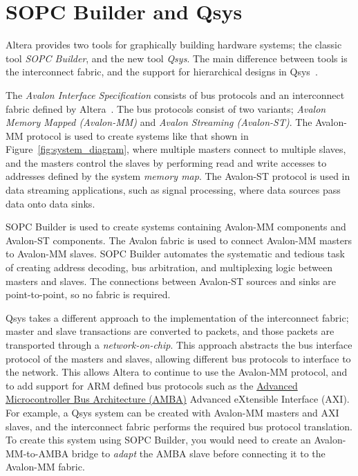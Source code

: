 \documentclass[10pt,twoside]{article}
\begin{document}
\clearpage
\section{SOPC Builder and Qsys}

Altera provides two tools for graphically building hardware
systems; the classic tool {\em SOPC Builder}, and the new tool 
{\em Qsys}. The main difference between tools is the interconnect
fabric, and the support for hierarchical designs in 
Qsys~\cite{Altera_Qsys_NoC_Whitepaper_2011}. 

The {\em Avalon Interface Specification} consists of bus protocols
and an interconnect fabric defined by 
Altera~\cite{Altera_Interface_Specification_SOPC_2011,
Altera_Interface_Specification_Qsys_2011}. The bus protocols
consist of two variants; {\em Avalon Memory Mapped (Avalon-MM)}
and {\em Avalon Streaming (Avalon-ST)}. The Avalon-MM protocol
is used to create systems like that shown in Figure~\ref{fig:system_diagram},
where multiple masters connect to multiple slaves,
and the masters control the slaves by performing read
and write accesses to addresses defined by the
system {\em memory map}. The Avalon-ST protocol
is used in data streaming applications, such as signal processing,
where data sources pass data onto data sinks.

SOPC Builder is used to create systems containing Avalon-MM 
components and Avalon-ST components. The Avalon fabric is used
to connect Avalon-MM masters to Avalon-MM slaves. SOPC Builder
automates the systematic and tedious task of creating address
decoding, bus arbitration, and multiplexing logic between masters and slaves.
The connections between Avalon-ST sources and sinks are 
point-to-point, so no fabric is required.

Qsys takes a different approach to the implementation of the 
interconnect fabric; master and slave transactions are
converted to packets, and those packets are transported
through a {\em network-on-chip}. This approach abstracts the
bus interface protocol of the masters and slaves, allowing
different bus protocols to interface to the network.
This allows Altera to continue to use the Avalon-MM protocol,
and to add support for ARM defined bus protocols such as the
\href{http://en.wikipedia.org/wiki/Advanced_Microcontroller_Bus_Architecture}
{Advanced Microcontroller Bus Architecture (AMBA)}
Advanced eXtensible Interface (AXI).
For example, a Qsys system can be created with Avalon-MM
masters and AXI slaves, and the interconnect fabric
performs the required bus protocol translation.
To create this system using SOPC Builder, you would need
to create an Avalon-MM-to-AMBA bridge to {\em adapt}
the AMBA slave before connecting it to the Avalon-MM fabric.
\end{document}
